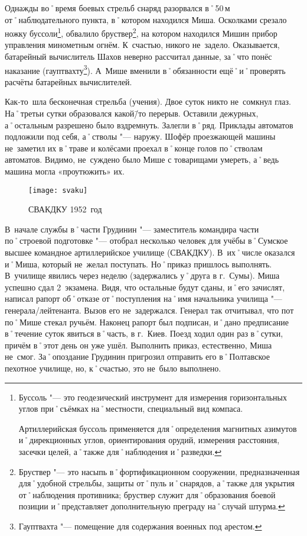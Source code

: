 Однажды во˚время боевых стрельб снаряд разорвался в˚50\,м от˚наблюдательного пункта, в˚котором находился Миша. Осколками срезало ножку буссоли\footnote{Буссоль "--- это геодезический инструмент для измерения горизонтальных углов при˚съёмках на˚местности, специальный вид компаса. 

Артиллерийская буссоль применяется для˚определения магнитных азимутов и˚дирекционных углов, ориентирования орудий, измерения расстояния, засечки целей, а˚также для˚наблюдения и˚разведки.}, обвалило бруствер\footnote{Бруствер "--- это насыпь в˚фортификационном сооружении, предназначенная для˚удобной стрельбы, защиты от˚пуль и˚снарядов, а˚также для укрытия от˚наблюдения противника; бруствер служит для˚образования боевой позиции и˚представляет дополнительную преграду на˚случай штурма.}, на котором находился Мишин прибор управления минометным огнём. К~счастью, никого не~задело. Оказывается, батарейный вычислитель Шахов неверно рассчитал данные, за˚что понёс наказание (гауптвахту\footnote{Гауптвахта "--- помещение для содержания военных под арестом.}). А~Мише вменили в˚обязанности ещё˚и˚проверять расчёты батарейных вычислителей. 

Как-то~шла бесконечная стрельба (учения). Двое суток никто не~сомкнул глаз. На˚третьи сутки образовался какой\=/то перерыв. Оставили дежурных, а˚остальным разрешено было вздремнуть. Залегли в˚ряд. Приклады автоматов подложили под себя, а˚стволы "---  наружу. Шофёр проезжающей машины не~заметил их в˚траве и колёсами проехал в˚конце голов по˚стволам автоматов. Видимо, не~суждено было Мише с товарищами умереть, а˚ведь машина могла «проутюжить» их.

\begin{wrapfigure}{O}{.4\textwidth}
\centering
\texttt{[image: svaku]}
\caption[СВАКДКУ 1952~год]{СВАКДКУ 1952~год\footnotemark}
\label{fig:svaku}
\end{wrapfigure}

В~начале службы в˚части Грудинин "--- заместитель командира части по˚строевой подготовке "--- отобрал несколько человек для учёбы в˚Сумское высшее командное артиллерийское училище (СВАКДКУ). В~их˚числе оказался и˚Миша, который не~желал поступать. Но˚приказ пришлось выполнять. В~училище явились через неделю (задержались у˚друга в г.~Сумы). Миша успешно сдал 2~экзамена. Видя, что остальные будут сданы, и˚его зачислят, написал рапорт об˚отказе от˚поступления на˚имя начальника училища "--- генерала\-/лейтенанта. Вызов его не~задержался. Генерал так отчитывал, что пот по˚Мише стекал ручьём. Наконец рапорт был подписан, и˚дано предписание в˚течение суток явиться в˚часть, в г.~Киев. Поезд ходил один раз в˚сутки, причём в˚этот день он уже ушёл. Выполнить приказ, естественно, Миша не~смог. За˚опоздание Грудинин пригрозил отправить его в˚Полтавское пехотное училище, но, к˚счастью, это не~было выполнено.  

